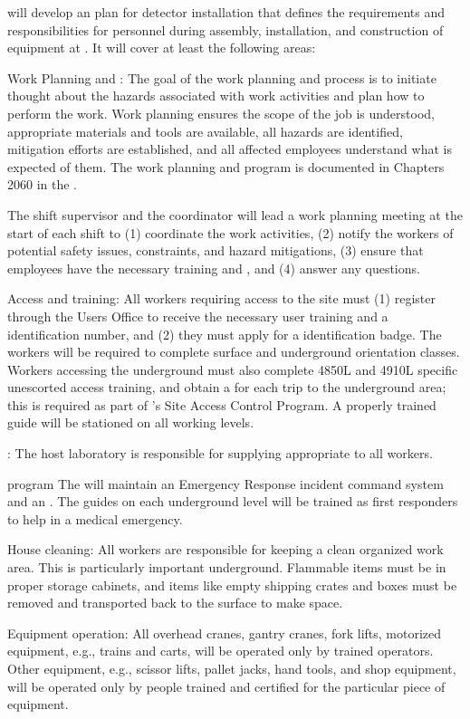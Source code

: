  will develop an   plan for detector  installation that defines  
the  requirements and responsibilities for personnel during  assembly, installation, and construction of equipment at . It will cover at least the following areas:

{Work Planning and :} The goal of the work planning and  process is to initiate thought about the hazards associated with work activities and plan how to perform the work. Work planning ensures the scope of the job is understood, appropriate materials and tools are available, all hazards are identified, mitigation efforts are established, and all affected employees understand what is expected of them. 
The work planning and  program is documented in Chapters 2060 in the .

The shift supervisor and the  coordinator  will lead a work planning meeting at the start of each shift  to (1) coordinate the work activities, (2) notify the workers of potential safety issues, constraints, and hazard mitigations, (3) ensure that employees have the necessary  training and , and (4) answer any questions.

{Access and training:}  All  workers requiring access to the  site must (1) register through the  Users Office to receive the necessary user training and a  identification number, and (2) they must apply for a  identification badge. 
The workers will be required to complete  surface and underground orientation classes. Workers accessing the underground must also complete 4850L and 4910L specific unescorted access training, and obtain a  for each trip to the underground area; this is required as part of 's Site Access Control Program. 
A properly trained guide will be stationed on all working levels. 

{:} 
The host laboratory is responsible for supplying appropriate  to all workers. 

{ program} The  will maintain an Emergency Response incident command system and an .  The guides on each underground level will be trained as first responders to help in a medical emergency.
  
  
  {House cleaning:} All workers are responsible for keeping a clean organized work area. This is particularly important underground. Flammable items must be in proper storage cabinets, and items like empty shipping crates and boxes must be removed and 
transported back to the surface to make space.


{Equipment operation:} All overhead cranes, gantry cranes, fork lifts, motorized equipment, e.g., trains and carts, will be operated only by trained  operators. 
Other equipment, e.g., scissor lifts, pallet jacks, hand tools, and shop equipment, will be operated only by people trained
and certified for the particular piece of equipment.
